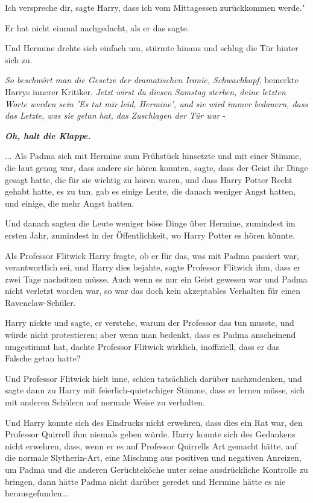 \glqq Ich verspreche dir\grqq{}, sagte Harry, \glqq dass ich vom Mittagessen
zurückkommen werde."

Er hat nicht einmal nachgedacht, als er das sagte.

Und Hermine drehte sich einfach um, stürmte hinaus und schlug die Tür hinter
sich zu.

\emph{So beschwört man die Gesetze der dramatischen Ironie, Schwachkopf},
bemerkte Harrys innerer Kritiker. \emph{ Jetzt wirst du diesen Samstag sterben,
deine letzten Worte werden sein 'Es tut mir leid, Hermine', und sie wird immer
bedauern, dass das Letzte, was sie getan hat, das }\emph{Zuschlagen der Tür war}
-

\textbf{\emph{Oh, halt die Klappe.}}

... Als Padma sich mit Hermine zum Frühstück hinsetzte und mit einer Stimme, die
laut genug war, dass andere sie hören konnten, sagte, dass der Geist ihr Dinge
gesagt hatte, die für sie wichtig zu hören waren, und dass Harry Potter Recht
gehabt hatte, es zu tun, gab es einige Leute, die danach weniger Angst hatten,
und einige, die mehr Angst hatten.

Und danach sagten die Leute weniger böse Dinge über Hermine, zumindest im ersten
Jahr, zumindest in der Öffentlichkeit, wo Harry Potter es hören könnte.

Als Professor Flitwick Harry fragte, ob er für das, was mit Padma passiert war,
verantwortlich sei, und Harry dies bejahte, sagte Professor Flitwick ihm, dass
er zwei Tage nachsitzen müsse. Auch wenn es nur ein Geist gewesen war und Padma
nicht verletzt worden war, so war das doch kein akzeptables Verhalten für einen
Ravenclaw-Schüler.

Harry nickte und sagte, er verstehe, warum der Professor das tun musste, und
würde nicht protestieren; aber wenn man bedenkt, dass es Padma anscheinend
umgestimmt hat, dachte Professor Flitwick wirklich, inoffiziell, dass er das
Falsche getan hatte?

Und Professor Flitwick hielt inne, schien tatsächlich darüber nachzudenken, und
sagte dann zu Harry mit feierlich-quietschiger Stimme, dass er lernen müsse,
sich mit anderen Schülern auf normale Weise zu verhalten.

Und Harry konnte sich des Eindrucks nicht erwehren, dass dies ein Rat war, den
Professor Quirrell ihm niemals geben würde. Harry konnte sich des Gedankens
nicht erwehren, dass, wenn er es auf Professor Quirrells Art gemacht hätte, auf
die normale Slytherin-Art, eine Mischung aus positiven und negativen Anreizen,
um Padma und die anderen Gerüchteköche unter seine ausdrückliche Kontrolle zu
bringen, dann hätte Padma nicht darüber geredet und Hermine hätte es nie
herausgefunden...

